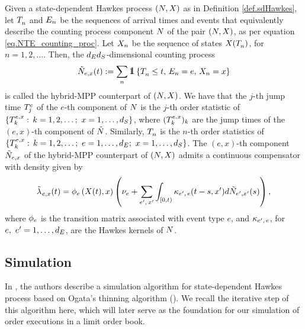 \documentclass[10pt]{article}
\begin{document}
Given a state-dependent Hawkes process $(\multiCountingProc, \stateVariable)$ as in Definition \ref{def.sdHawkes}, let $\arrivalTimes[]_n$ and $\event[n]$ be the sequences of arrival times and events that equivalently describe the counting process component $\multiCountingProc$ of the pair $(\multiCountingProc, \stateVariable)$, as per equation \eqref{eq.NTE_counting_proc}. Let $\stateVariable_n$ be the sequence of states $X(\arrivalTimes[]_n)$, for $n=1,2,\dots$. Then, the 
$\numEventTypes\numStates$-dimensional counting process
\begin{equation}\label{eq.hybridHawkes}
 \hybridHawkes_{e,x}(t) := 
 \sum_{n} \one \left\lbrace \arrivalTimes[]_n \leq t, \, \event[n] = e, \, 
 \stateVariable_n = x \right\rbrace
\end{equation}
is called the hybrid-MPP counterpart of  $(\multiCountingProc, \stateVariable)$.
We have that the $j$-th jump time $\arrivalTimes[e]_j$ of the $e$-th component of $\multiCountingProc$ is the $j$-th order statistic of $\lbrace \arrivalTimes[e,x]_k: \, k=1,2,\dots; \, \, x=1,\dots,\numStates \rbrace$, where $(\arrivalTimes[e,x]_k)_k$ are the jump times of the $(e,x)$-th component of $\hybridHawkes$. Similarly, $\arrivalTimes[]_n$ is the $n$-th order statistics of $\lbrace \arrivalTimes[e,x]_k: \, k=1,2,\dots; \, \, e=1,\dots, \numEventTypes; \, \,  x=1,\dots,\numStates \rbrace$. The $(e,x)$-th component $ \hybridHawkes_{e,x}$ of the hybrid-MPP counterpart of $(\multiCountingProc, \stateVariable)$ admits a continuous compensator with density given by 
\begin{equation}\label{eq.intensity_of_hybridMPP}
 \hybridIntensity_{e,x}(t) 
 =
 \transProb_{e}\left(\stateVariable(t),x\right)
 \left(
 \baseRate_e
 +\sum_{\eone,\, \xone} \int_{[0,t)} \hawkesKernel\subscriptee(t-s,\xone)d\hybridHawkes_{\eone,\xone}(s)
 \right),
\end{equation}
where $\transProb_{e}$ is the transition matrix associated with event type $e$, and $\hawkesKernel\subscriptee$, for $e,\, \, \eone = 1,\dots,\numEventTypes$, are the Hawkes kernels of $\multiCountingProc$.


\subsection{Simulation}\label{sec.simulation}
In \citealp{MP18sta}, the authors describe a simulation algorithm for state-dependent Hawkes process based on Ogata's thinning algorithm (\citealp{Oga81lew}). We recall the iterative step of this algorithm here, which will later serve as the foundation for our simulation of order executions in a limit order book.
\end{document}
